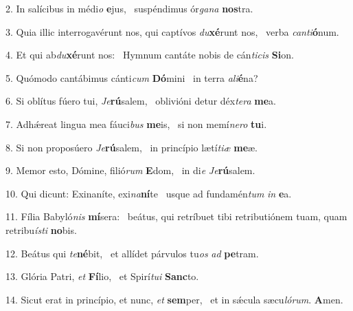 2. In salícibus in médi\textit{o} \textbf{e}jus, \ast\  suspéndimus ór\textit{ga}\textit{na} \textbf{nos}tra.\

3. Quia illic interrogavérunt nos, qui captívos \textit{du}\textbf{xé}runt nos, \ast\  verba \textit{can}\textit{ti}\textbf{ó}num.\

4. Et qui ab\textit{du}\textbf{xé}runt nos: \ast\  Hymnum cantáte nobis de cán\textit{ti}\textit{cis} \textbf{Si}on.\

5. Quómodo cantábimus cánti\textit{cum} \textbf{Dó}mini \ast\  in terra \textit{a}\textit{li}\textbf{é}na?\

6. Si oblítus fúero tui, \textit{Je}\textbf{rú}salem, \ast\  oblivióni detur déx\textit{te}\textit{ra} \textbf{me}a.\

7. Adhǽreat lingua mea fáuci\textit{bus} \textbf{me}is, \ast\  si non memí\textit{ne}\textit{ro} \textbf{tu}i.\

8. Si non proposúero \textit{Je}\textbf{rú}salem, \ast\  in princípio lætí\textit{ti}\textit{æ} \textbf{me}æ.\

9. Memor esto, Dómine, filió\textit{rum} \textbf{E}dom, \ast\  in di\textit{e} \textit{Je}\textbf{rú}salem.\

10. Qui dicunt: Exinaníte, exi\textit{na}\textbf{ní}te \ast\  usque ad fundamén\textit{tum} \textit{in} \textbf{e}a.\

11. Fília Babyló\textit{nis} \textbf{mí}sera: \ast\  beátus, qui retríbuet tibi retributiónem tuam, quam retribu\textit{ís}\textit{ti} \textbf{no}bis.\

12. Beátus qui \textit{te}\textbf{né}bit, \ast\  et allídet párvulos tu\textit{os} \textit{ad} \textbf{pe}tram.\

13. Glória Patri, \textit{et} \textbf{Fí}lio, \ast\  et Spirí\textit{tu}\textit{i} \textbf{Sanc}to.\

14. Sicut erat in princípio, et nunc, \textit{et} \textbf{sem}per, \ast\  et in sǽcula sæcu\textit{ló}\textit{rum}. \textbf{A}men.\

